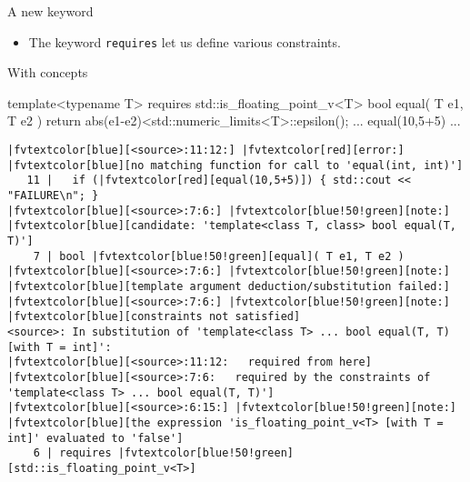 \begin{frame}[fragile]
  \begin{block}{A new keyword}
    \begin{itemize}
      \item The keyword \texttt{requires} let us define various constraints.
    \end{itemize}
  \end{block}
  \begin{exampleblock}{With concepts}
    \scriptsize
    \begin{cppcode*}{}
    template<typename T>
    requires std::is_floating_point_v<T>
    bool equal( T e1, T e2 ) {
      return abs(e1-e2)<std::numeric_limits<T>::epsilon();
    }
    ... equal(10,5+5) ...
    \end{cppcode*}
    \pause
    \tiny
    \begin{Verbatim}[commandchars=\|\[\]]
|fvtextcolor[blue][<source>:11:12:] |fvtextcolor[red][error:] |fvtextcolor[blue][no matching function for call to 'equal(int, int)']
   11 |   if (|fvtextcolor[red][equal(10,5+5)]) { std::cout << "FAILURE\n"; }
|fvtextcolor[blue][<source>:7:6:] |fvtextcolor[blue!50!green][note:] |fvtextcolor[blue][candidate: 'template<class T, class> bool equal(T, T)']
    7 | bool |fvtextcolor[blue!50!green][equal]( T e1, T e2 )
|fvtextcolor[blue][<source>:7:6:] |fvtextcolor[blue!50!green][note:]   |fvtextcolor[blue][template argument deduction/substitution failed:]
|fvtextcolor[blue][<source>:7:6:] |fvtextcolor[blue!50!green][note:] |fvtextcolor[blue][constraints not satisfied]
<source>: In substitution of 'template<class T> ... bool equal(T, T) [with T = int]':
|fvtextcolor[blue][<source>:11:12:   required from here]
|fvtextcolor[blue][<source>:7:6:   required by the constraints of 'template<class T> ... bool equal(T, T)']
|fvtextcolor[blue][<source>:6:15:] |fvtextcolor[blue!50!green][note:] |fvtextcolor[blue][the expression 'is_floating_point_v<T> [with T = int]' evaluated to 'false']
    6 | requires |fvtextcolor[blue!50!green][std::is_floating_point_v<T>]
    \end{Verbatim}
  \end{exampleblock}
\end{frame}

